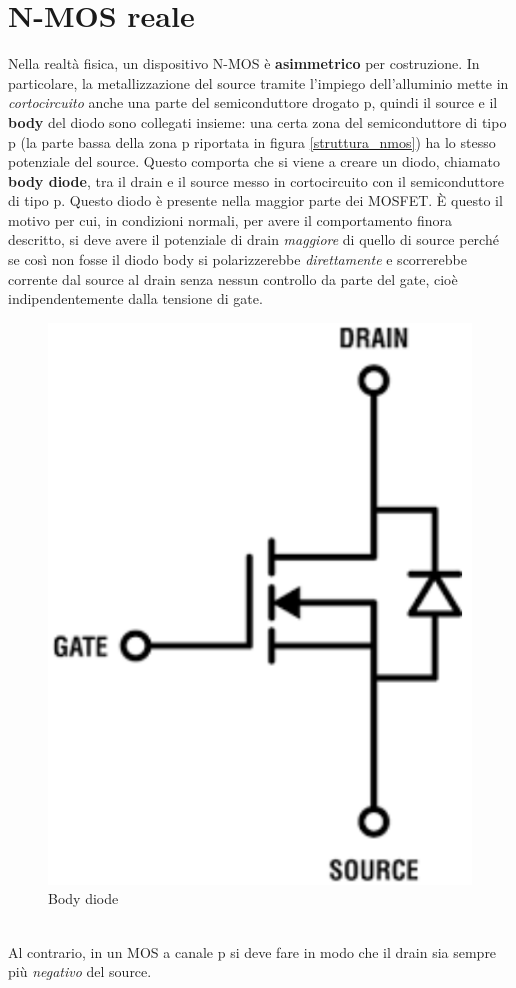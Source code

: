 \documentclass[12pt, a4paper]{report}
\begin{document}
\section{N-MOS reale}
Nella realtà fisica, un dispositivo N-MOS è \textbf{asimmetrico} per costruzione. In particolare, la metallizzazione del source tramite l'impiego dell'alluminio mette in \textit{cortocircuito} anche una parte del semiconduttore drogato p, quindi il source e il \textbf{body} del diodo sono collegati insieme: una certa zona del semiconduttore di tipo p (la parte bassa della zona p riportata in figura \ref{struttura_nmos}) ha lo stesso potenziale del source. Questo comporta che si viene a creare un diodo, chiamato \textbf{body diode}, tra il drain e il source messo in cortocircuito con il semiconduttore di tipo p. Questo diodo è presente nella maggior parte dei MOSFET. È questo il motivo per cui, in condizioni normali, per avere il comportamento finora descritto, si deve avere il potenziale di drain \textit{maggiore} di quello di source perché se così non fosse il diodo body si polarizzerebbe \textit{direttamente} e scorrerebbe corrente dal source al drain senza nessun controllo da parte del gate, cioè indipendentemente dalla tensione di gate.
\begin{figure}[h]
    \centering
    \includegraphics[scale=0.4,angle=0]{n_mos_reale.png}
    \caption{Body diode}
\end{figure}
\\Al contrario, in un MOS a canale p si deve fare in modo che il drain sia sempre più \textit{negativo} del source.
\end{document}
